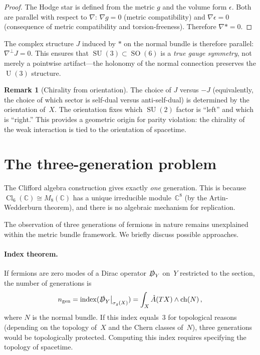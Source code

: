 \documentclass[12pt,a4paper]{article}
\theoremstyle{definition}
\newtheorem{remark}[theorem]{Remark}
\newcommand{\SO}{\operatorname{SO}}
\newcommand{\SU}{\operatorname{SU}}
\newcommand{\U}{\operatorname{U}}
\newcommand{\Cl}{\operatorname{Cl}}
\newcommand{\C}{\mathbb{C}}
\begin{document}
\begin{proof}
The Hodge star is defined from the metric $g$ and the volume form $\epsilon$.
Both are parallel with respect to $\nabla$: $\nabla g = 0$ (metric compatibility) and $\nabla \epsilon = 0$ (consequence of metric compatibility and torsion-freeness).
Therefore $\nabla \ast = 0$.
\end{proof}

The complex structure $J$ induced by $\ast$ on the normal bundle is therefore parallel: $\nabla^\perp J = 0$.
This ensures that $\SU(3) \subset \SO(6)$ is a \emph{true gauge symmetry}, not merely a pointwise artifact---the holonomy of the normal connection preserves the $\U(3)$ structure.

\begin{remark}[Chirality from orientation]
The choice of $J$ versus $-J$ (equivalently, the choice of which sector is self-dual versus anti-self-dual) is determined by the orientation of~$X$.
The orientation fixes which $\SU(2)$ factor is ``left'' and which is ``right.''
This provides a geometric origin for parity violation: the chirality of the weak interaction is tied to the orientation of spacetime.
\end{remark}


\section{The three-generation problem}
\label{sec:generations}

The Clifford algebra construction gives exactly \emph{one} generation.
This is because $\Cl_6(\C) \cong M_8(\C)$ has a unique irreducible module~$\C^8$ (by the Artin-Wedderburn theorem), and there is no algebraic mechanism for replication.

The observation of three generations of fermions in nature remains unexplained within the metric bundle framework.
We briefly discuss possible approaches.

\paragraph{Index theorem.}
If fermions are zero modes of a Dirac operator $\slashed{D}_Y$ on~$Y$ restricted to the section, the number of generations is
\begin{equation}
n_{\mathrm{gen}} = \mathrm{index}(\slashed{D}_Y\big|_{\sigma_g(X)}) = \int_X \hat{A}(TX) \wedge \mathrm{ch}(N)\,,
\end{equation}
where $N$ is the normal bundle.
If this index equals~3 for topological reasons (depending on the topology of~$X$ and the Chern classes of~$N$), three generations would be topologically protected.
Computing this index requires specifying the topology of spacetime.
\end{document}
